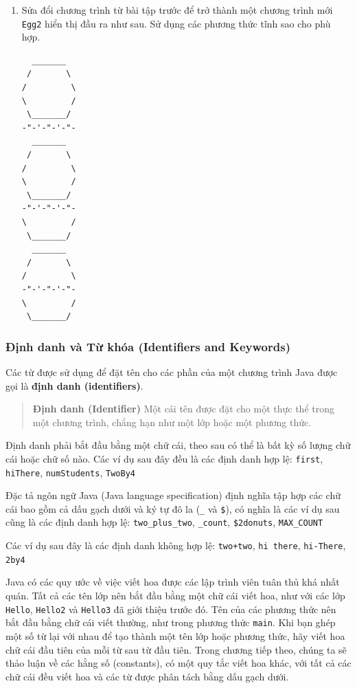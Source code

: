 \begin{enumerate}
\begin{verbatim}
   _______ 
  /       \ 
 /         \ 
 -"-'-"-'-"- 
 \         / 
  \_______/
\end{verbatim}
\item
  Sửa đổi chương trình từ bài tập trước để trở thành một chương trình
  mới \texttt{Egg2} hiển thị đầu ra như sau. Sử dụng các phương thức
  tĩnh sao cho phù hợp.

\begin{verbatim}
  _______
 /       \
/         \
\         /
 \_______/
-"-'-"-'-"-
  _______
 /       \
/         \
\         /
 \_______/
-"-'-"-'-"-
\         /
 \_______/
  _______
 /       \
/         \
-"-'-"-'-"-
\         /
 \_______/
\end{verbatim}
\end{enumerate}

\subsubsection{Định danh và Từ khóa (Identifiers and
Keywords)}\label{ux111ux1ecbnh-danh-vuxe0-tux1eeb-khuxf3a-identifiers-and-keywords}

Các từ được sử dụng để đặt tên cho các phần của một chương trình Java
được gọi là \textbf{định danh (identifiers)}.

\begin{quote}
\textbf{Định danh (Identifier)} Một cái tên được đặt cho một thực thể
trong một chương trình, chẳng hạn như một lớp hoặc một phương thức.
\end{quote}

Định danh phải bắt đầu bằng một chữ cái, theo sau có thể là bất kỳ số
lượng chữ cái hoặc chữ số nào. Các ví dụ sau đây đều là các định danh
hợp lệ: \texttt{first}, \texttt{hiThere}, \texttt{numStudents},
\texttt{TwoBy4}

Đặc tả ngôn ngữ Java (Java language specification) định nghĩa tập hợp
các chữ cái bao gồm cả dấu gạch dưới và ký tự đô la (\texttt{\_} và
\texttt{\$}), có nghĩa là các ví dụ sau cũng là các định danh hợp lệ:
\texttt{two\_plus\_two}, \texttt{\_count}, \texttt{\$2donuts},
\texttt{MAX\_COUNT}

Các ví dụ sau đây là các định danh không hợp lệ: \texttt{two+two},
\texttt{hi\ there}, \texttt{hi-There}, \texttt{2by4}

Java có các quy ước về việc viết hoa được các lập trình viên tuân thủ
khá nhất quán. Tất cả các tên lớp nên bắt đầu bằng một chữ cái viết hoa,
như với các lớp \texttt{Hello}, \texttt{Hello2} và \texttt{Hello3} đã
giới thiệu trước đó. Tên của các phương thức nên bắt đầu bằng chữ cái
viết thường, như trong phương thức \texttt{main}. Khi bạn ghép một số từ
lại với nhau để tạo thành một tên lớp hoặc phương thức, hãy viết hoa chữ
cái đầu tiên của mỗi từ sau từ đầu tiên. Trong chương tiếp theo, chúng
ta sẽ thảo luận về các hằng số (constants), có một quy tắc viết hoa
khác, với tất cả các chữ cái đều viết hoa và các từ được phân tách bằng
dấu gạch dưới.


